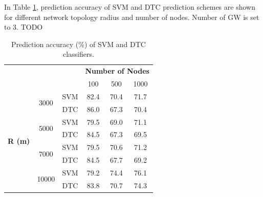 \documentclass[conference]{IEEEtran}
\begin{document}
\par In Table \ref{table:prediction_accuracy}, prediction accuracy of SVM and DTC prediction schemes are shown for different network topology radius and number of nodes. Number of GW is set to 3. TODO

\begin{table}
\centering
\caption{Prediction accuracy (\%) of SVM and DTC classifiers.}
\label{table:prediction_accuracy}
\begin{tabular}{|c|c|c|c|c|c|}
\hline
\multicolumn{3}{|c|}{\multirow{2}{*}{}}                        & \multicolumn{3}{c|}{\textbf{Number of Nodes}} \\ \cline{4-6}
\multicolumn{3}{|c|}{}                                         & 100           & 500           & 1000          \\ \hline
\multirow{8}{*}{\textbf{R (m)}} & \multirow{2}{*}{3000}  & SVM & 82.4          & 70.4          & 71.7          \\ \cline{3-6}
                                &                        & DTC & 86.0          & 67.3          & 70.4          \\ \cline{2-6}

                                & \multirow{2}{*}{5000}  & SVM & 79.5          & 69.0          & 71.1          \\ \cline{3-6}
                                &                        & DTC & 84.5          & 67.3          & 69.5          \\ \cline{2-6}

                                & \multirow{2}{*}{7000}  & SVM & 79.5          & 70.6          & 71.2          \\ \cline{3-6}
                                &                        & DTC & 84.5          & 67.7          & 69.2          \\ \cline{2-6}

                                & \multirow{2}{*}{10000} & SVM & 79.2          & 74.4          & 76.1          \\ \cline{3-6}
                                &                        & DTC & 83.8          & 70.7          & 74.3          \\ \hline
\end{tabular}
\end{table}
\end{document}
